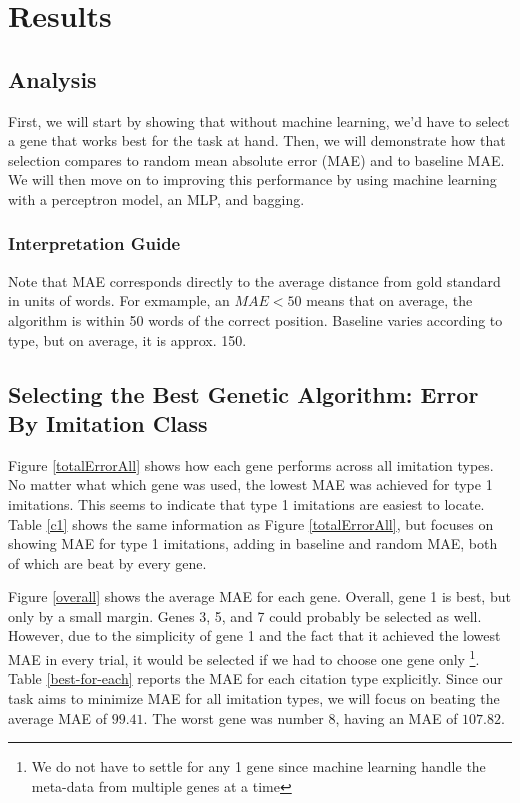 \section {Results}
\label{results}

\subsection {Analysis}
First, we will start by showing that without machine learning, we'd have to select a gene that works best for the task at hand. Then, we will demonstrate how that selection compares to random mean absolute error (MAE) and to baseline MAE. We will then move on to improving this performance by using machine learning with a perceptron model, an MLP, and bagging.

\subsubsection{Interpretation Guide}
Note that MAE corresponds directly to the average distance from gold standard in units of words. For exmample, an $MAE < 50$ means that on average, the algorithm is within 50 words of the correct position. Baseline varies according to type, but on average, it is approx. 150.

\subsection{Selecting the Best Genetic Algorithm: Error By Imitation Class}
Figure \ref{totalErrorAll} shows how each gene performs across all imitation types. No matter what which gene was used, the lowest MAE was achieved for type 1 imitations. This seems to indicate that type 1 imitations are easiest to locate. Table \ref{c1} shows the same information as Figure \ref{totalErrorAll}, but focuses on showing MAE for type 1 imitations, adding in baseline and random MAE, both of which are beat by every gene.

Figure \ref{overall} shows the average MAE for each gene. Overall, gene 1 is best, but only by a small margin. Genes 3, 5, and 7 could probably be selected as well. However, due to the simplicity of gene 1 and the fact that it achieved the lowest MAE in every trial, it would be selected if we had to choose one gene only \footnote{We do not have to settle for any 1 gene since machine learning handle the meta-data from multiple genes at a time}. Table \ref{best-for-each} reports the MAE for each citation type explicitly. Since our task aims to minimize MAE for all imitation types, we will focus on beating the average MAE of $99.41$. The worst gene was number 8, having an MAE of $107.82$. 

